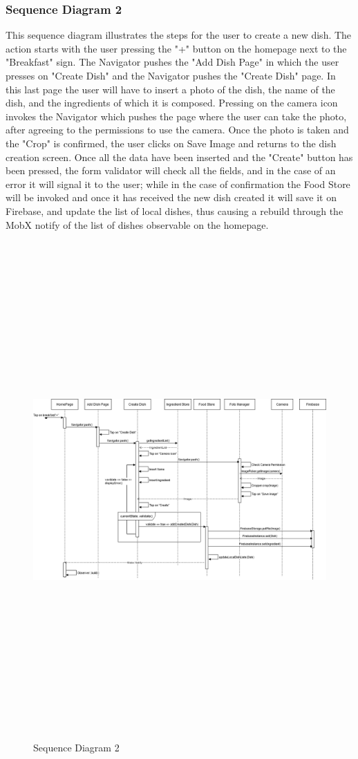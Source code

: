 \documentclass [12pt]{article}
\begin{document}
\subsubsection{Sequence Diagram 2}
This sequence diagram illustrates the steps for the user to create a new dish.
The action starts with the user pressing the "+" button on the homepage next to the "Breakfast" sign. The Navigator pushes the "Add Dish Page" in which the user presses on "Create Dish" and the Navigator pushes the "Create Dish" page.
In this last page the user will have to insert a photo of the dish, the name of the dish, and the ingredients of which it is composed.
Pressing on the camera icon invokes the Navigator which pushes the page where the user can take the photo, after agreeing to the permissions to use the camera. Once the photo is taken and the "Crop" is confirmed, the user clicks on Save Image and returns to the dish creation screen. 
Once all the data have been inserted and the "Create" button has been pressed, the form validator will check all the fields, and in the case of an error it will signal it to the user; while in the case of confirmation the Food Store will be invoked and once it has received the new dish created it will save it on Firebase, and update the list of local dishes, thus causing a rebuild through the MobX notify of the list of dishes observable on the homepage.
\begin{figure}[ht!]
\centering
\includegraphics[height=19cm, width=\linewidth]{SequenceCreateDish.png}
\caption{Sequence Diagram 2}
\end{figure}  
\clearpage
\end{document}
